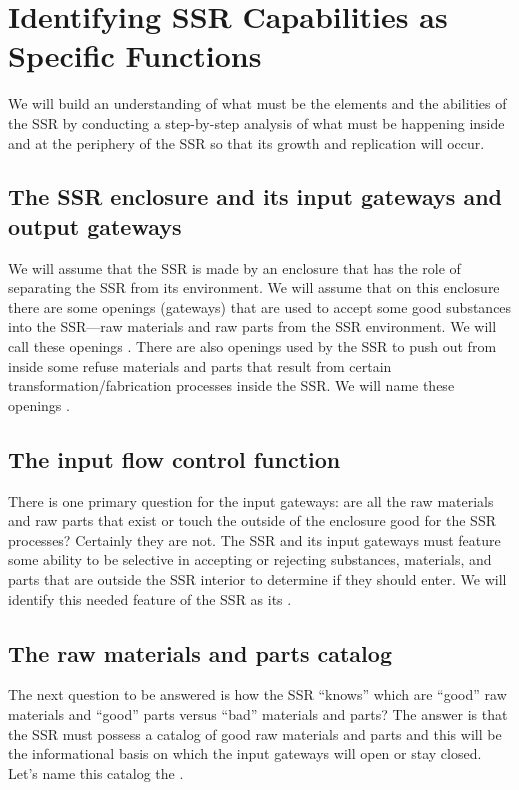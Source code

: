 \section{Identifying SSR Capabilities as Specific Functions}

We will build an
understanding of what must be the elements and the abilities of the
SSR by conducting a step-by-step analysis of what must be happening inside and at
the periphery of the SSR so that its growth and replication will occur.

\subsection[The SSR enclosure and its input gateways and output
gateways]{The SSR enclosure and its input gateways and output gateways}

We will assume that the SSR is
made by an enclosure that has the role of separating the SSR from its
environment. We will assume that on this enclosure there are some
openings (gateways) that are used to accept some good
substances into the SSR---raw materials and raw parts from the SSR environment. We
will call these openings . There are also
openings used by the SSR to push out from inside some refuse materials
and parts that result from certain transformation/fabrication processes
inside the SSR. We will name these openings .

\subsection[The input flow control function]{The input flow control
function}

There is one primary question
for the input gateways: are all the raw materials and raw parts that
exist or touch the outside of the enclosure good for the SSR processes?
Certainly they are not. The SSR and its input gateways must feature some
ability to be selective in accepting or rejecting substances, materials,
and parts that are outside the SSR interior to determine if they should enter. We will
identify this needed feature of the SSR as its .

\subsection[The raw materials and parts catalog]{The raw materials and
parts catalog}

The next question to be answered
is how the SSR “knows” which are “good” raw materials and “good” parts
versus “bad” materials and parts? The answer is that the SSR must
possess a catalog of good raw materials and parts and this will be the
informational basis on which the input gateways will open or stay
closed. Let’s name this catalog the .

